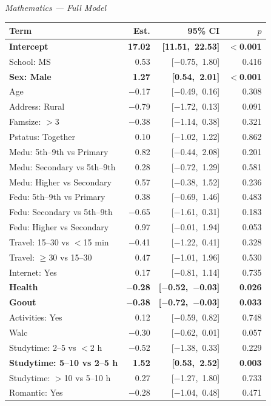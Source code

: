 \documentclass{article}
\begin{document}
\vspace{0.5em}
\noindent
\begin{minipage}[t]{0.49\textwidth}
\centering
\scriptsize
\textit{Mathematics --- Full Model}\\[4pt]
\begin{tabularx}{\textwidth}{Xrrr}
\toprule
\textbf{Term} & \textbf{Est.} & \textbf{95\% CI} & \textbf{$p$} \\
\midrule
\textbf{Intercept}            & \textbf{17.02} & \textbf{[11.51,\ 22.53]} & \textbf{$<$0.001} \\
School: MS                    &  0.53 & [$-$0.75,\ 1.80] & 0.416 \\
\textbf{Sex: Male}            & \textbf{1.27} & \textbf{[0.54,\ 2.01]} & \textbf{$<$0.001} \\
Age                           & $-$0.17 & [$-$0.49,\ 0.16] & 0.308 \\
Address: Rural                & $-$0.79 & [$-$1.72,\ 0.13] & 0.091 \\
Famsize: $>$3                 & $-$0.38 & [$-$1.14,\ 0.38] & 0.321 \\
Pstatus: Together             &  0.10 & [$-$1.02,\ 1.22] & 0.862 \\
Medu: 5th--9th vs Primary     &  0.82 & [$-$0.44,\ 2.08] & 0.201 \\
Medu: Secondary vs 5th--9th   &  0.28 & [$-$0.72,\ 1.29] & 0.581 \\
Medu: Higher vs Secondary     &  0.57 & [$-$0.38,\ 1.52] & 0.236 \\
Fedu: 5th--9th vs Primary     &  0.38 & [$-$0.69,\ 1.46] & 0.483 \\
Fedu: Secondary vs 5th--9th   & $-$0.65 & [$-$1.61,\ 0.31] & 0.183 \\
Fedu: Higher vs Secondary     &  0.97 & [$-$0.01,\ 1.94] & 0.053 \\
Travel: 15--30 vs $<$15 min   & $-$0.41 & [$-$1.22,\ 0.41] & 0.328 \\
Travel: $\geq$30 vs 15--30    &  0.47 & [$-$1.01,\ 1.96] & 0.530 \\
Internet: Yes                 &  0.17 & [$-$0.81,\ 1.14] & 0.735 \\
\textbf{Health}               & \textbf{$-$0.28} & \textbf{[$-$0.52,\ $-$0.03]} & \textbf{0.026} \\
\textbf{Goout}                & \textbf{$-$0.38} & \textbf{[$-$0.72,\ $-$0.03]} & \textbf{0.033} \\
Activities: Yes               &  0.12 & [$-$0.59,\ 0.82] & 0.748 \\
Walc                          & $-$0.30 & [$-$0.62,\ 0.01] & 0.057 \\
Studytime: 2--5 vs $<$2 h     & $-$0.52 & [$-$1.38,\ 0.33] & 0.229 \\
\textbf{Studytime: 5--10 vs 2--5 h} & \textbf{1.52} & \textbf{[0.53,\ 2.52]} & \textbf{0.003} \\
Studytime: $>$10 vs 5--10 h   &  0.27 & [$-$1.27,\ 1.80] & 0.733 \\
Romantic: Yes                 & $-$0.28 & [$-$1.04,\ 0.48] & 0.471 \\
\bottomrule
\end{tabularx}
\end{minipage}
\end{document}
